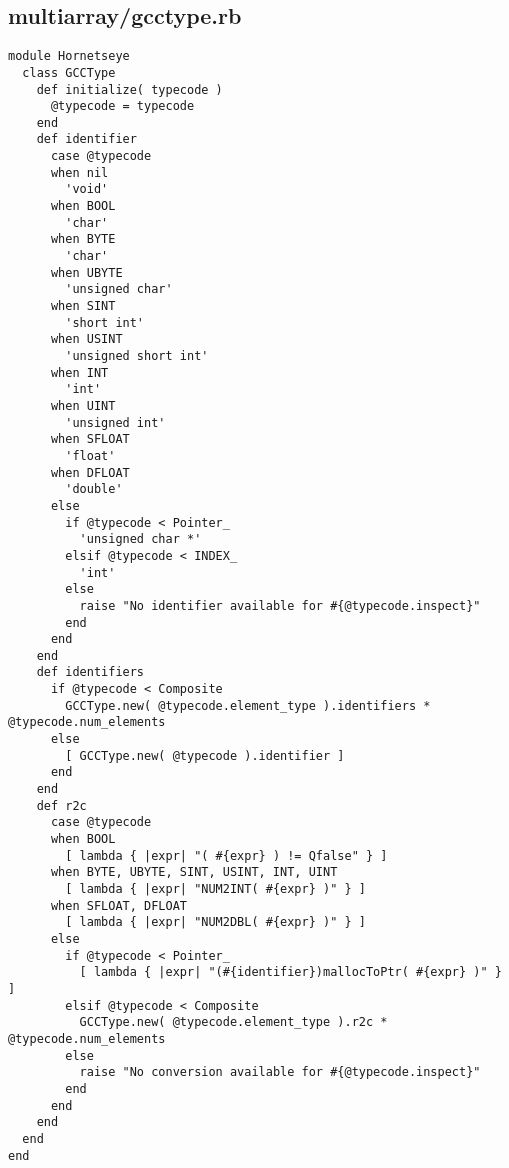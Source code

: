 \subsection{multiarray/gcctype.rb}\label{cha:multiarray-gcctype-rb}
\begin{lstlisting}
module Hornetseye
  class GCCType
    def initialize( typecode )
      @typecode = typecode
    end
    def identifier
      case @typecode
      when nil
        'void'
      when BOOL
        'char'
      when BYTE
        'char'
      when UBYTE
        'unsigned char'
      when SINT
        'short int'
      when USINT
        'unsigned short int'
      when INT
        'int'
      when UINT
        'unsigned int'
      when SFLOAT
        'float'
      when DFLOAT
        'double'
      else
        if @typecode < Pointer_
          'unsigned char *'
        elsif @typecode < INDEX_
          'int'
        else
          raise "No identifier available for #{@typecode.inspect}"
        end
      end
    end
    def identifiers
      if @typecode < Composite
        GCCType.new( @typecode.element_type ).identifiers * @typecode.num_elements
      else
        [ GCCType.new( @typecode ).identifier ]
      end
    end
    def r2c
      case @typecode
      when BOOL
        [ lambda { |expr| "( #{expr} ) != Qfalse" } ]
      when BYTE, UBYTE, SINT, USINT, INT, UINT
        [ lambda { |expr| "NUM2INT( #{expr} )" } ]
      when SFLOAT, DFLOAT
        [ lambda { |expr| "NUM2DBL( #{expr} )" } ]
      else
        if @typecode < Pointer_
          [ lambda { |expr| "(#{identifier})mallocToPtr( #{expr} )" } ]
        elsif @typecode < Composite
          GCCType.new( @typecode.element_type ).r2c * @typecode.num_elements
        else
          raise "No conversion available for #{@typecode.inspect}"
        end
      end
    end
  end
end
\end{lstlisting}
